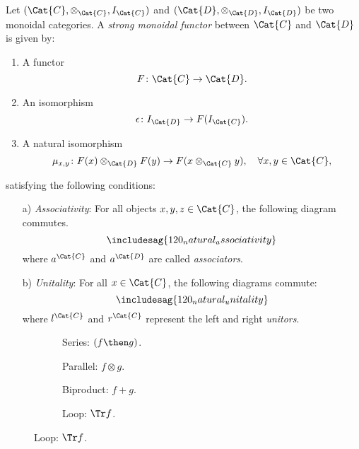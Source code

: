 \begin{ctdefinition}
Let $(\Cat{C},\otimes_\Cat{C},I_\Cat{C})$ and $(\Cat{D},\otimes_\Cat{D},I_\Cat{D})$ be two monoidal categories. A \emph{strong monoidal functor} between $\Cat{C}$ and $\Cat{D}$ is given by:
\begin{enumerate}
    \item A functor
    \begin{equation}
        F\colon \Cat{C}\to \Cat{D}.
    \end{equation}
    \item An isomorphism
    \begin{equation}
        \epsilon\colon I_\Cat{D}\to F(I_\Cat{C}).
    \end{equation}
    \item A natural isomorphism
    \begin{equation}
        \mu_{x,y}\colon F(x)\otimes_\Cat{D} F(y) \to F(x\otimes_\Cat{C} y),\quad \forall x,y\in \Cat{C},
    \end{equation}
\end{enumerate}
satisfying the following conditions:
\begin{enumerate}
    \item[a)] \emph{Associativity}: For all objects $x,y,z\in \Cat{C}$, the following diagram commutes.
    \begin{equation}
        \includesag{120_natural_associativity}
    \end{equation}
    where $a^\Cat{C}$ and $a^\Cat{D}$ are called \emph{associators}.
    \item[b)] \emph{Unitality}: For all $x\in \Cat{C}$, the following diagrams commute:
    \begin{equation}
        \includesag{120_natural_unitality}
    \end{equation}
    where $l^\Cat{C}$ and $r^\Cat{C}$ represent the left and right \emph{unitors}.
\end{enumerate}
\end{ctdefinition}


\begin{figure}[h!]
\centering
\begin{subfigure}{0.2\textwidth}
\centering
{}
\caption{Series: $(f \then g)$.}
\end{subfigure}
\hspace{10mm} %
\begin{subfigure}{0.2\textwidth}
\centering
{}
\caption{Parallel: $f \otimes g$.}
\end{subfigure}
\hspace{10mm} %
\begin{subfigure}{0.2\textwidth}
\centering
{}
\caption{Biproduct: $f + g$.}
\end{subfigure}
\hspace{10mm} %
\begin{subfigure}{0.2\textwidth}
\centering
{}
\caption{Loop: $\Tr f$.}
\end{subfigure}
\label{fig:diagrams}
\end{figure}


